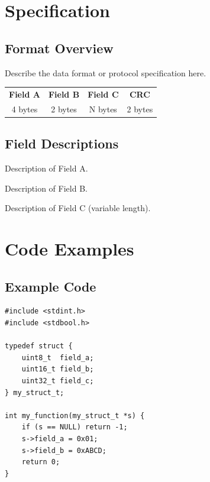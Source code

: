 \documentclass[11pt,a4paper]{article}
\begin{document}
\newpage

\section{Specification}

\subsection{Format Overview}
Describe the data format or protocol specification here.

\begin{center}
    \begin{tabular}{|c|c|c|c|}
        \hline
        \textbf{Field A} & \textbf{Field B} & \textbf{Field C} & \textbf{CRC} \\
        4 bytes          & 2 bytes          & N bytes          & 2 bytes      \\
        \hline
    \end{tabular}
\end{center}

\subsection{Field Descriptions}
\begin{description}[style=nextline]
    \item[\textbf{Field A}] Description of Field A.
    \item[\textbf{Field B}] Description of Field B.
    \item[\textbf{Field C}] Description of Field C (variable length).
\end{description}

\newpage

\section{Code Examples}

\subsection{Example Code}
\begin{lstlisting}[caption={Example C code snippet}]
#include <stdint.h>
#include <stdbool.h>

typedef struct {
    uint8_t  field_a;
    uint16_t field_b;
    uint32_t field_c;
} my_struct_t;

int my_function(my_struct_t *s) {
    if (s == NULL) return -1;
    s->field_a = 0x01;
    s->field_b = 0xABCD;
    return 0;
}
\end{lstlisting}
\end{document}
